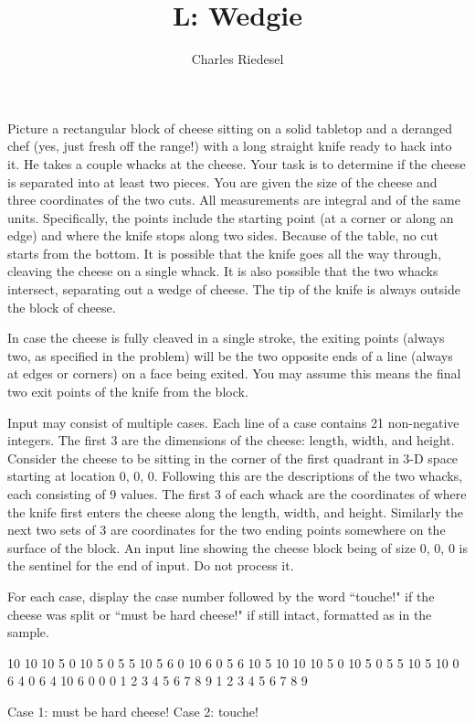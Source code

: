 \documentclass{article}
\title{L: Wedgie}
\author{Charles Riedesel}
\begin{document}
\begin{problemDescription}
Picture a rectangular block of cheese sitting on a solid tabletop and a 
deranged chef (yes, just fresh off the range!) with a long straight knife 
ready to hack into it.  He takes a couple whacks at the cheese.  Your
task is to determine if the cheese is separated into at least two pieces.
You are given the size of the cheese and three coordinates of the two cuts.
All measurements are integral and of the same units.  Specifically, the 
points include the starting point (at a corner or along an edge) and where the
knife stops along two sides. Because of the table, no cut starts from the
bottom.  It is possible that the knife goes all the way through, cleaving
the cheese on a single whack.  It is also possible that the two whacks 
intersect, separating out a wedge of cheese.  The tip of the knife is
always outside the block of cheese.

In case the cheese is fully cleaved in a single stroke, the exiting points (always
two, as specified in the problem) will be the two opposite ends of a line (always
at edges or corners) on a face being exited.  You may assume this means the final 
two exit points of the knife from the block.
\end{problemDescription}

\begin{inputDescription}
Input may consist of multiple cases. Each line of a case contains 21 
non-negative integers.  The first 3 are the dimensions of the cheese: 
length, width, and height.  Consider the cheese to be sitting in the 
corner of the first quadrant in 3-D space starting at location 0, 0, 0.
Following this are the descriptions of the two whacks, each consisting of
9 values.  The first 3 of each whack are the coordinates of where the knife 
first enters the cheese along the length, width, and height.  Similarly the 
next two sets of 3 are coordinates for the two ending points somewhere on the 
surface of the block.  An input line showing the cheese block being of size
0, 0, 0 is the sentinel for the end of input.  Do not process it.
\end{inputDescription}

\begin{outputDescription}
For each case, display the case number followed by the word ``touche!" if
the cheese was split or ``must be hard cheese!" if still intact, formatted 
as in the sample.
\end{outputDescription}

\begin{sampleInput}
10 10 10     5 0 10   5 0 5   5 10 5      6 0 10   6 0 5   6 10 5
10 10 10     5 0 10   5 0 5   5 10 5      10 0 6   4 0 6   4 10 6
0 0 0    1 2 3   4 5 6  7 8 9    1 2 3   4 5 6   7 8 9
\end{sampleInput}
\begin{sampleOutput}
Case 1: must be hard cheese!
Case 2: touche!
\end{sampleOutput}
\end{document}
